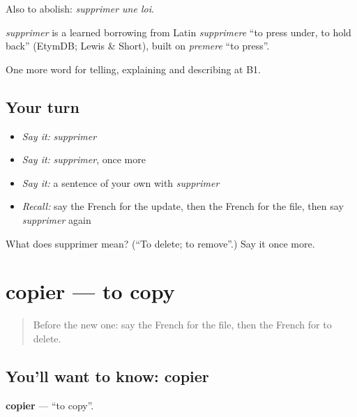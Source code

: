 Also to abolish: \emph{supprimer une loi}.

\begin{cousinweb}
\emph{supprimer} is a learned borrowing from Latin \emph{supprimere} \textquotedblleft{}to press under, to hold back\textquotedblright{} (EtymDB; Lewis \& Short), built on \emph{premere} \textquotedblleft{}to press\textquotedblright{}.
\end{cousinweb}

\begin{grammarlens}[title={What you've built}]
One more word for telling, explaining and describing at B1.
\end{grammarlens}

\subsection*{Your turn}
\begin{itemize}
\raggedright
  \item \emph{Say it:} \emph{supprimer}
  \item \emph{Say it:} \emph{supprimer}, once more
  \item \emph{Say it:} a sentence of your own with \emph{supprimer}
  \item \emph{Recall:} say the French for the update, then the French for the file, then say \emph{supprimer} again
\end{itemize}

\begin{tcolorbox}[breakable,colback=teal!4,colframe=teal!35!black,title={Before you move on}]
What does supprimer mean? (\textquotedblleft{}To delete; to remove\textquotedblright{}.) Say it once more.
\end{tcolorbox}
\section[copier]{copier — to copy}

\label{lesson:FR-C397-copier}



\begin{quote}
Before the new one: say the French for the file, then the French for to delete.
\end{quote}

\subsection*{You'll want to know: copier}
\textbf{copier} — \textquotedblleft{}to copy\textquotedblright{}.

